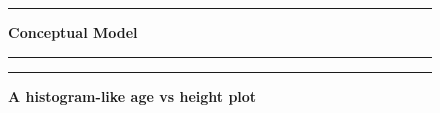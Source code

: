 \documentclass[]{article}
\begin{document}
\begin{figure}[!ht]
    \hrule
    \caption{ \textbf{Conceptual Model} }
    \begin{center}
    \end{center}
    \label{fig:age-height-graph}
  \hrule
  \vspace{2.5mm}
      \caption{\textbf{ A histogram-like age vs height plot }   }
      \label{fig:combined}
  \vspace{-2.5mm}
  \hrule
\end{figure}
\end{document}
